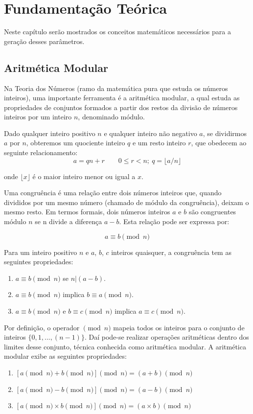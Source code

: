 \chapter{Fundamentação Teórica}
Neste capítulo serão mostrados os conceitos matemáticos necessários para a geração desses parâmetros.

%
%
\section{Aritmética Modular}
Na Teoria dos Números \cite{Niven:2014} (ramo da matemática pura que estuda os números inteiros), uma importante ferramenta é a aritmética modular,  a qual estuda as propriedades de conjuntos formados a partir dos restos da divisão de números inteiros por um inteiro $n$, denominado módulo.

Dado qualquer inteiro positivo \(n\) e qualquer inteiro não negativo \(a\), se dividirmos \(a\) por \(n\), obteremos um quociente inteiro \(q\) e um resto inteiro \(r\), que obedecem ao seguinte relacionamento:
\begin{equation}
  a=qn+r \qquad 0 \leq r<n;\ q=\lfloor a/n \rfloor
\end{equation}

onde $\lfloor x \rfloor$ é o maior inteiro menor ou igual a \(x\).

Uma congruência é  uma relação entre dois números inteiros que, quando divididos por um mesmo número (chamado de módulo da congruência), deixam o mesmo resto.  Em termos formais, dois números inteiros \(a\) e \(b\) são congruentes módulo \(n\) se n divide a diferença \(a - b\).  Esta relação pode ser expressa por:

\begin{equation}
  a \equiv b \pmod n \label{eq:1}
\end{equation}

Para um inteiro positivo \(n\) e \(a\), \(b\), \(c\) inteiros quaisquer, a congruência tem as seguintes propriedades:
\begin{enumerate}
  \item $a \equiv b \pmod n$ se $n|(a-b)$.
  \item $a \equiv b \pmod n$ implica $b \equiv a \pmod n$.
  \item $a \equiv b \pmod n$ e $b \equiv c \pmod n$ implica $a \equiv c \pmod n$.
\end{enumerate}

Por definição, o operador $\pmod n$ mapeia todos os inteiros para o conjunto de inteiros $\{0, 1, ..., (n-1)\}$. Daí pode-se realizar operações aritméticas dentro dos limites desse conjunto, técnica conhecida como aritmética modular. A aritmética modular exibe as seguintes propriedades:
\begin{enumerate}
  \item $[a \pmod n + b \pmod n] \pmod n = (a + b) \pmod n$
  \item $[a \pmod n - b \pmod n] \pmod n = (a - b) \pmod n$
  \item $[a \pmod n \times b \pmod n] \pmod n = (a \times b) \pmod n$
\end{enumerate}

